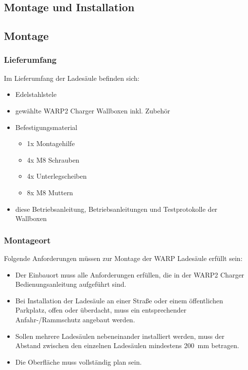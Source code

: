 \documentclass[a4paper,10pt]{article}
\begin{document}
\begin{multicols*}{2}
	\section{Montage und Installation}
	\subsection{Montage}
	\subsubsection{Lieferumfang}
	Im Lieferumfang der Ladesäule befinden sich:
	\begin{itemize}
		\item Edelstahlstele
		\item gewählte WARP2 Charger Wallboxen inkl. Zubehör
		\item Befestigungsmaterial
			\begin{itemize}
				\item 1x Montagehilfe
				\item 4x M8 Schrauben
				\item 4x Unterlegscheiben
				\item 8x M8 Muttern
			\end{itemize}
		\item diese Betriebsanleitung, Betriebsanleitungen und Testprotokolle der Wallboxen
	\end{itemize}
\vspace{-0.1cm}
	\subsubsection{Montageort}
	Folgende Anforderungen müssen zur Montage der WARP Ladesäule erfüllt sein:
	\begin{itemize}
		\item Der Einbauort muss alle Anforderungen erfüllen, die in der
		WARP2 Charger Bedienungsanleitung aufgeführt sind.
		\item Bei Installation der Ladesäule an einer Straße oder einem
		öffentlichen Parkplatz, offen oder überdacht, muss ein entsprechender
		Anfahr-/Rammschutz angebaut werden.
		\item Sollen mehrere Ladesäulen nebeneinander installiert werden, muss
		der Abstand zwischen den einzelnen Ladesäulen mindestens \SI{200}{\milli\meter} betragen.
		\item Die Oberfläche muss vollständig plan sein.
	\end{itemize}


\end{multicols*}
\end{document}
